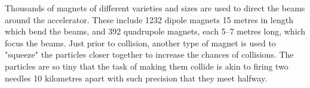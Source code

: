 Thousands of magnets of different varieties and sizes are used to direct the beams around the accelerator. These include 1232 dipole magnets 15 metres in length which bend the beams, and 392 quadrupole magnets, each 5–7 metres long, which focus the beams. Just prior to collision, another type of magnet is used to "squeeze" the particles closer together to increase the chances of collisions. The particles are so tiny that the task of making them collide is akin to firing two needles 10 kilometres apart with such precision that they meet halfway.